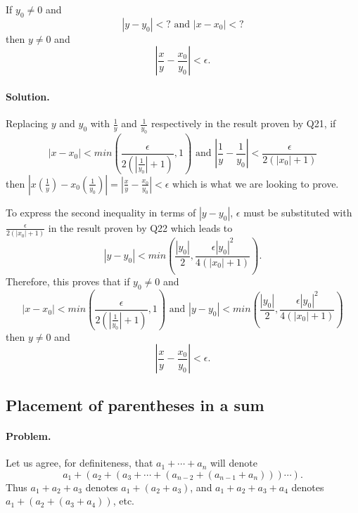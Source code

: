 \documentclass{article}
\begin{document}
If $y_0 \neq 0$ and \begin{equation*}
  |y - y_0| < ? \text{ and } |x - x_0| < ?
\end{equation*} then $y \neq 0$ and \begin{equation*}
  \left|\frac{x}{y} - \frac{x_0}{y_0}\right| < \epsilon.
\end{equation*}

\paragraph{Solution.} Replacing $y$ and $y_0$ with $\frac{1}{y}$ and $\frac{1}{y_0}$ respectively in the result proven by Q21, if \begin{equation*}
  |x - x_0| < min\left(\frac{\epsilon}{2(|\frac{1}{y_0}| + 1)}, 1\right) \text{ and } \left|\frac{1}{y} - \frac{1}{y_0}\right| < \frac{\epsilon}{2(|x_0| + 1)}
\end{equation*} then $|x(\frac{1}{y}) - x_0(\frac{1}{y_0})| = \left|\frac{x}{y} - \frac{x_0}{y_0}\right| < \epsilon$ which is what we are looking to prove.

To express the second inequality in terms of $|y - y_0|$, $\epsilon$ must be substituted with $\frac{\epsilon}{2(|x_0| + 1)}$ in the result proven by Q22 which leads to \begin{equation*}
  |y - y_0| < min\left(\frac{|y_0|}{2}, \frac{\epsilon|y_0|^2}{4(|x_0| + 1)}\right).
\end{equation*} Therefore, this proves that if $y_0 \neq 0$ and \begin{equation*}
  |x - x_0| < min\left(\frac{\epsilon}{2(|\frac{1}{y_0}| + 1)}, 1\right) \text{ and } |y - y_0| < min\left(\frac{|y_0|}{2}, \frac{\epsilon|y_0|^2}{4(|x_0| + 1)}\right)
\end{equation*} then $y \neq 0$ and \begin{equation*}
  \left|\frac{x}{y} - \frac{x_0}{y_0}\right| < \epsilon.
\end{equation*}

\setcounter{subsection}{23}
\subsection{Placement of parentheses in a sum}

\paragraph{Problem.} Let us agree, for definiteness, that $a_1 + \cdots + a_n$ will denote \begin{equation*}
  a_1 + (a_2 + (a_3 + \cdots + (a_{n-2} + (a_{n-1} + a_n)))\cdots).
\end{equation*} Thus $a_1 + a_2 + a_3$ denotes $a_1 + (a_2 + a_3)$, and $a_1 + a_2 + a_3 + a_4$ denotes $a_1 + (a_2 + (a_3 + a_4))$, etc.
\end{document}
